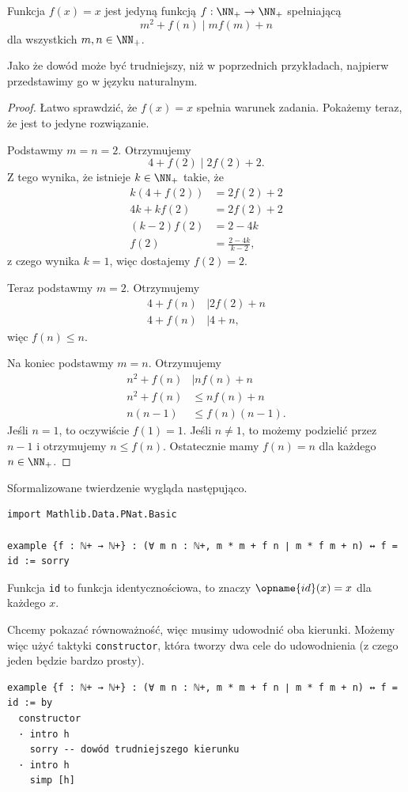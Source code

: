 \documentclass[polish,pretty,bibliography=totocnumbered]{angav}
\newcommand{\Lean}[1]{\texttt{#1}}
\begin{document}
\begin{theorem}
    Funkcja $f(x) = x$ jest jedyną funkcją $f : \NN_+ \to \NN_+$ spełniającą
    \[ m^2 + f(n) \mid mf(m) + n \]
    dla wszystkich $m, n \in \NN_+$.
\end{theorem}
Jako że dowód może być trudniejszy, niż w poprzednich przykładach, najpierw przedstawimy go w języku naturalnym.
\begin{proof}
    Łatwo sprawdzić, że $f(x) = x$ spełnia warunek zadania. Pokażemy teraz, że jest to jedyne rozwiązanie.

    Podstawmy $m = n = 2$. Otrzymujemy
    \[ 4 + f(2) \mid 2f(2) + 2. \]
    Z tego wynika, że istnieje $k \in \NN_+$ takie, że
    \begin{align*}
        k(4 + f(2)) &= 2f(2) + 2 \\
        4k + kf(2) &= 2f(2) + 2 \\
        (k - 2)f(2) &= 2 - 4k \\
        f(2) &= \frac{2 - 4k}{k - 2},
    \end{align*}
    z czego wynika $k = 1$, więc dostajemy $f(2) = 2$.

    Teraz podstawmy $m = 2$. Otrzymujemy
    \begin{align*}
        4 + f(n) &\mid 2f(2) + n \\
        4 + f(n) &\mid 4 + n,
    \end{align*}
    więc $f(n) \leq n$.

    Na koniec podstawmy $m = n$. Otrzymujemy
    \begin{align*}
        n^2 + f(n) &\mid nf(n) + n \\
        n^2 + f(n) &\leq nf(n) + n \\
        n(n - 1) &\leq f(n)(n - 1).
    \end{align*}
    Jeśli $n = 1$, to oczywiście $f(1) = 1$. Jeśli $n \neq 1$, to możemy podzielić przez $n - 1$ i otrzymujemy $n \leq f(n)$. Ostatecznie mamy $f(n) = n$ dla każdego $n \in \NN_+$.
\end{proof}

Sformalizowane twierdzenie wygląda następująco.
\begin{verbatim}
import Mathlib.Data.PNat.Basic

example {f : ℕ+ → ℕ+} : (∀ m n : ℕ+, m * m + f n ∣ m * f m + n) ↔ f = id := sorry
\end{verbatim}
Funkcja \Lean{id} to funkcja identycznościowa, to znaczy $\opname{id}(x) = x$ dla każdego $x$.

Chcemy pokazać równoważność, więc musimy udowodnić oba kierunki. Możemy więc użyć taktyki \Lean{constructor}, która tworzy dwa cele do udowodnienia (z czego jeden będzie bardzo prosty).
\begin{verbatim}
example {f : ℕ+ → ℕ+} : (∀ m n : ℕ+, m * m + f n ∣ m * f m + n) ↔ f = id := by
  constructor
  · intro h
    sorry -- dowód trudniejszego kierunku
  · intro h
    simp [h]
\end{verbatim}
\end{document}
